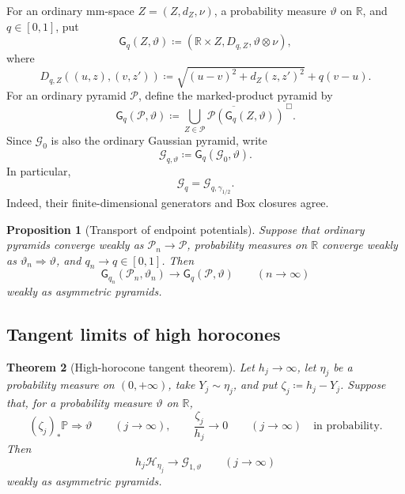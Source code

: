 \documentclass{amsart}
\numberwithin{equation}{section}
\theoremstyle{plain}
\newtheorem{theorem}{Theorem}[section]
\newtheorem{proposition}[theorem]{Proposition}
\theoremstyle{definition}
\theoremstyle{remark}
\newcommand{\R}{\mathbb R}
\newcommand{\Pyr}{\mathcal P}
\begin{document}
For an ordinary mm-space $Z=(Z,d_Z,\nu)$, a probability measure $\vartheta$ on $\R$, and $q\in[0,1]$, put
\begin{equation}\label{eq:marked-directed-space}
 \mathsf G_q(Z,\vartheta)\coloneqq(\R\times Z,D_{q,Z},\vartheta\otimes\nu),
\end{equation}
where
\begin{equation}\label{eq:Dq-general}
 D_{q,Z}((u,z),(v,z'))\coloneqq\sqrt{(u-v)^2+d_Z(z,z')^2}+q(v-u).
\end{equation}
For an ordinary pyramid $\mathcal P$, define the marked-product pyramid by
\begin{equation}\label{eq:marked-pyramid-operation}
 \mathsf G_q(\mathcal P,\vartheta)
 \coloneqq\overline{\bigcup_{Z\in\mathcal P}\Pyr(\mathsf G_q(Z,\vartheta))}^{\,\Box}.
\end{equation}
Since $\mathcal G_0$ is also the ordinary Gaussian pyramid, write
\begin{equation}\label{eq:G-q-mark-law}
 \mathcal G_{q,\vartheta}\coloneqq\mathsf G_q(\mathcal G_0,\vartheta).
\end{equation}
In particular,
\begin{equation}\label{eq:Gq-mark-specialization} \mathcal G_q=\mathcal G_{q,\gamma_{1/2}}. \end{equation}
Indeed, their finite-dimensional generators and Box closures agree.

\begin{proposition}[Transport of endpoint potentials]\label{prop:endpoint-potential-transport}
Suppose that ordinary pyramids converge weakly as $\mathcal P_n\to\mathcal P$, probability measures on $\R$ converge weakly
as $\vartheta_n\Rightarrow\vartheta$, and $q_n\to q\in[0,1]$.  Then
\begin{equation}\label{eq:directed-marked-product-limit}
 \mathsf G_{q_n}(\mathcal P_n,\vartheta_n)
 \longrightarrow\mathsf G_q(\mathcal P,\vartheta)\qquad(n\to\infty)
\end{equation}
weakly as asymmetric pyramids.
\end{proposition}

\subsection{Tangent limits of high horocones}

\begin{theorem}[High-horocone tangent theorem]\label{thm:horocone-tangent}
Let $h_j\to\infty$, let $\eta_j$ be a probability measure on $(0,+\infty)$, take $Y_j\sim\eta_j$, and put
$\zeta_j\coloneqq h_j-Y_j$.  Suppose that, for a probability measure $\vartheta$ on $\R$,
\begin{equation}\label{eq:tangent-height-assumptions}
 (\zeta_j)_*\mathbb P\Rightarrow\vartheta\qquad(j\to\infty),
 \qquad
 \frac{\zeta_j}{h_j}\longrightarrow0\qquad(j\to\infty)
 \quad\text{in probability}.
\end{equation}
Then
\begin{equation}\label{eq:horocone-tangent-limit}
 h_j\mathcal H_{\eta_j}\longrightarrow\mathcal G_{1,\vartheta}\qquad(j\to\infty)
\end{equation}
weakly as asymmetric pyramids.
\end{theorem}
\end{document}
